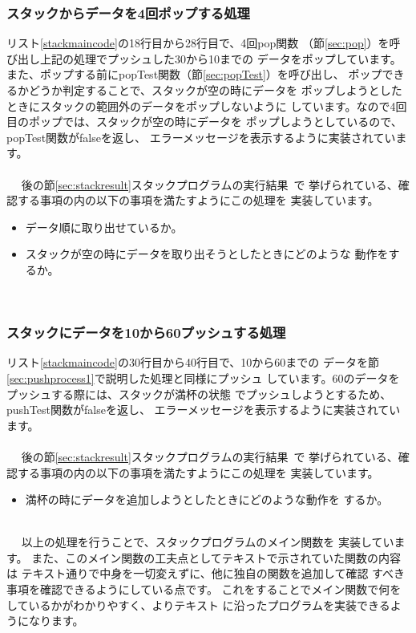 \documentclass[a4j]{jarticle}
\begin{document}
\subsubsection{スタックからデータを4回ポップする処理}
リスト\ref{stackmaincode}の18行目から28行目で、4回pop関数
（節\ref{sec:pop}）を呼び出し上記の処理でプッシュした30から10までの
データをポップしています。
また、ポップする前にpopTest関数（節\ref{sec:popTest}）を呼び出し、
ポップできるかどうか判定することで、スタックが空の時にデータを
ポップしようとしたときにスタックの範囲外のデータをポップしないように
しています。なので4回目のポップでは、スタックが空の時にデータを
ポップしようとしているので、popTest関数がfalseを返し、
エラーメッセージを表示するように実装されています。
\\\\~~
後の節\ref{sec:stackresult}スタックプログラムの実行結果~で
挙げられている、確認する事項の内の以下の事項を満たすようにこの処理を
実装しています。
\begin{itemize}
  \item データ順に取り出せているか。
  \item スタックが空の時にデータを取り出そうとしたときにどのような
        動作をするか。
\end{itemize}
~~
\subsubsection{スタックにデータを10から60プッシュする処理}
リスト\ref{stackmaincode}の30行目から40行目で、10から60までの
データを節\ref{sec:pushprocess1}で説明した処理と同様にプッシュ
しています。60のデータをプッシュする際には、スタックが満杯の状態
でプッシュしようとするため、pushTest関数がfalseを返し、
エラーメッセージを表示するように実装されています。
\\\\~~
後の節\ref{sec:stackresult}スタックプログラムの実行結果~で
挙げられている、確認する事項の内の以下の事項を満たすようにこの処理を
実装しています。
\begin{itemize}
  \item 満杯の時にデータを追加しようとしたときにどのような動作を
        するか。
\end{itemize}
~~
\\~~
以上の処理を行うことで、スタックプログラムのメイン関数を
実装しています。
また、このメイン関数の工夫点としてテキストで示されていた関数の内容は
テキスト通りで中身を一切変えずに、他に独自の関数を追加して確認
すべき事項を確認できるようにしている点です。
これをすることでメイン関数で何をしているかがわかりやすく、よりテキスト
に沿ったプログラムを実装できるようになります。
\end{document}
